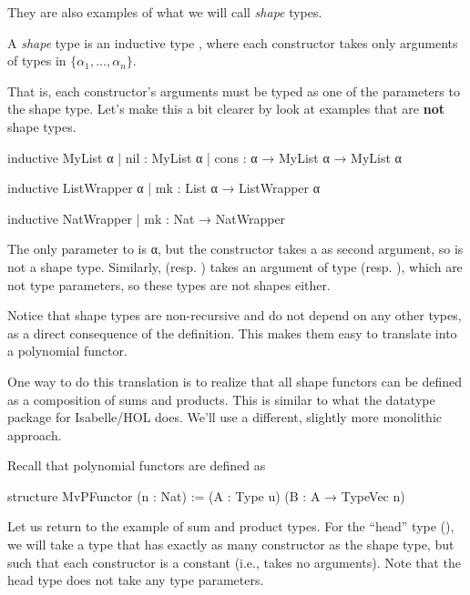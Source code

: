 \documentclass[titlepage]{report}
\newenvironment{definition}[1][Definition:]{\begin{trivlist}                         
    \item[\hskip \labelsep {\bfseries #1}]}{\end{trivlist}}
\newenvironment{remark}[1][Remark:]{\begin{trivlist}                         
    \item[\hskip \labelsep {\bfseries #1}]}{\end{trivlist}}
\begin{document}
They are also examples of what we will call \emph{shape} types.
\begin{definition}
    A \emph{shape} type is an inductive type , 
    where each constructor takes only arguments of types in $\{α_1, ..., α_n\}$.
\end{definition}
That is, each constructor's arguments must be typed as one of the parameters to the shape type.
Let's make this a bit clearer by look at examples that are \textbf{not} shape types. 

\begin{leancode}
    inductive MyList α
      | nil  : MyList α 
      | cons : α → MyList α → MyList α

    inductive ListWrapper α
      | mk : List α → ListWrapper α

    inductive NatWrapper
      | mk : Nat → NatWrapper
\end{leancode}

The only parameter to  is α, but the  constructor takes a  as second argument,
so  is not a shape type.
Similarly,  (resp. ) takes an argument of type  (resp. ),
which are not type parameters, so these types are not shapes either.

Notice that shape types are non-recursive and do not depend on any other types, as a direct consequence 
of the definition. This makes them easy to translate into a polynomial functor. 

\begin{remark}
    One way to do this translation is to realize that all shape functors can be defined as a
    composition of sums and products. 
    This is similar to what the datatype package for Isabelle/HOL does.
    We'll use a different, slightly more monolithic approach.
\end{remark}

Recall that polynomial functors are defined as
\begin{leancode}
    structure MvPFunctor (n : Nat) :=
      (A : Type u) (B : A → TypeVec n)
\end{leancode}


Let us return to the example of sum and product types. 
For the ``head'' type (), we will take a type that has exactly as many constructor as
the shape type, but such that each constructor is a constant (i.e., takes no arguments).
Note that the head type does not take any type parameters. 
\end{document}
